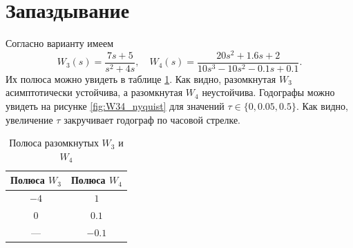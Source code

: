 \section{Запаздывание}

Согласно варианту имеем
\begin{equation*}
    W_3(s)=\frac{7s+5}{s^2+4s},\quad W_4(s)=\frac{20s^2+1.6s+2}{10s^3-10s^2-0.1s+0.1}.
\end{equation*}
Их полюса можно увидеть в таблице \ref{tab:polesW34}. Как видно, разомкнутая 
$W_3$ асимптотически устойчива, а разомкнутая $W_4$ неустойчива.
Годографы можно увидеть на рисунке \ref{fig:W34_nyquist} для значений
$\tau\in\{0, 0.05, 0.5\}$. Как видно, увеличение $\tau$ закручивает
годограф по часовой стрелке. 

\begin{table}[H]
    \centering
    \caption{Полюса разомкнутых $W_3$ и $W_4$}
    \begin{tabular}{|c|c|}
    \hline
    Полюса $W_3$ & Полюса $W_4$        \\ \hline
        $-4$ & $1$ \\ \hline
        $0$ & $0.1$ \\ \hline
        --- & $-0.1$ \\ \hline
    \end{tabular}
    \label{tab:polesW34}
\end{table}

